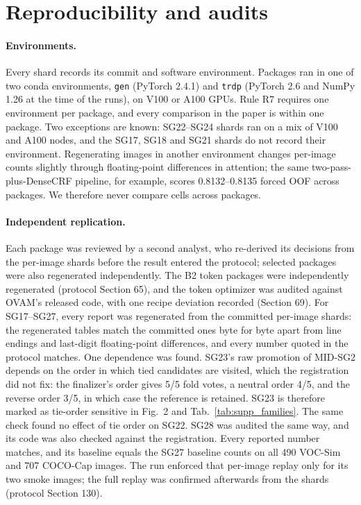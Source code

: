 \section{Reproducibility and audits}
\label{sec:supp_reproducibility}
\paragraph{Environments.}
Every shard records its commit and software environment. Packages ran in one of two conda environments, \texttt{gen} (PyTorch 2.4.1) and \texttt{trdp} (PyTorch 2.6 and NumPy 1.26 at the time of the runs), on V100 or A100 GPUs. Rule R7 requires one environment per package, and every comparison in the paper is within one package. Two exceptions are known: SG22--SG24 shards ran on a mix of V100 and A100 nodes, and the SG17, SG18 and SG21 shards do not record their environment. Regenerating images in another environment changes per-image counts slightly through floating-point differences in attention; the same two-pass-plus-DenseCRF pipeline, for example, scores 0.8132--0.8135 forced OOF across packages. We therefore never compare cells across packages.

\paragraph{Independent replication.}
Each package was reviewed by a second analyst, who re-derived its decisions from the per-image shards before the result entered the protocol; selected packages were also regenerated independently. The B2 token packages were independently regenerated (protocol Section 65), and the token optimizer was audited against OVAM's released code, with one recipe deviation recorded (Section 69). For SG17--SG27, every report was regenerated from the committed per-image shards: the regenerated tables match the committed ones byte for byte apart from line endings and last-digit floating-point differences, and every number quoted in the protocol matches. One dependence was found. SG23's raw promotion of MID-SG2 depends on the order in which tied candidates are visited, which the registration did not fix: the finalizer's order gives 5/5 fold votes, a neutral order 4/5, and the reverse order 3/5, in which case the reference is retained. SG23 is therefore marked as tie-order sensitive in Fig.~2 and Tab.~\ref{tab:supp_families}. The same check found no effect of tie order on SG22. SG28 was audited the same way, and its code was also checked against the registration. Every reported number matches, and its baseline equals the SG27 baseline counts on all 490 VOC-Sim and 707 COCO-Cap images. The run enforced that per-image replay only for its two smoke images; the full replay was confirmed afterwards from the shards (protocol Section 130).

